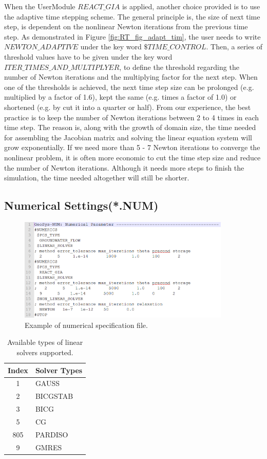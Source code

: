 When the UserModule $REACT\_GIA$ is applied, another choice provided is to use the adaptive time stepping scheme. The general principle is, the size of next time step, is dependent on the nonlinear Newton iterations from the previous time step. As demonstrated in Figure \ref{fig:RT_fig_adapt_tim}, the user needs to write $NEWTON\_ADAPTIVE$ under the key word $\$TIME\_CONTROL$.  Then, a series of threshold values have to be given under the key word $ITER\_TIMES\_AND\_MULTIPLYER$, to define the threshold regarding the number of Newton iterations and the multiplying factor for the next step. When one of the thresholds is achieved, the next time step size can be prolonged (e.g. multiplied by a factor of 1.6), kept the same (e.g. times a factor of 1.0) or shortened (e.g. by cut it into a quarter or half). From our experience, the best practice is to keep the number of Newton iterations between 2 to 4 times in each time step. The reason is, along with the growth of domain size, the time needed for assembling the Jacobian matrix and solving the linear equation system will grow exponentially. If we need more than 5 - 7 Newton iterations to converge the nonlinear problem, it is often more economic to cut the time step size and reduce the number of Newton iterations. Although it needs more steps to finish the simulation, the time needed altogether will still be shorter. 

\subsection{Numerical Settings(*.NUM)}

\begin{figure}
\includegraphics[width=0.9\textwidth]{RT/figs/RT_fig_num_file}
\caption{Example of numerical specification file. }
\label{fig:RT_fig_num_file}
\end{figure}

\begin{table}
\label{tab:RT_tab_linear_solvers}
\caption{Available types of linear solvers supported. }
\begin{tabular}{c p{5.5cm}}
\hline
Index    & Solver Types  \\
\hline
 1  & GAUSS \\
 2  & BICGSTAB \\
 3  & BICG \\
 5  & CG \\
805 & PARDISO \\ 
 9  & GMRES \\ 
\hline
\end{tabular}
\end{table}

